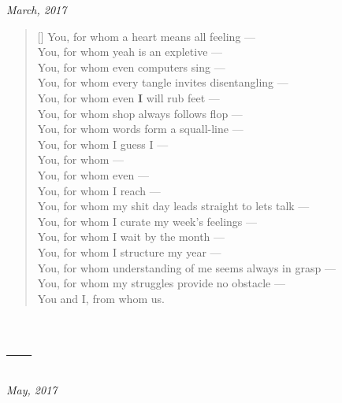 \hfill\textit{March, 2017}

\begin{verse}[\textwidth]
  You, for whom a heart means all feeling ---\\
  You, for whom yeah is an expletive ---\\
  You, for whom even computers sing ---\\
  You, for whom every tangle invites disentangling ---\\
  You, for whom even \textbf{I} will rub feet ---\\
  You, for whom shop always follows flop ---\\
  You, for whom words form a squall-line ---\\
  You, for whom I guess I ---\\
  You, for whom ---\\
  You, for whom even ---\\
  You, for whom I reach ---\\
  You, for whom my shit day leads straight to lets talk ---\\
  You, for whom I curate my week's feelings ---\\
  You, for whom I wait by the month ---\\
  You, for whom I structure my year ---\\
  You, for whom understanding of me seems always in grasp ---\\
  You, for whom my struggles provide no obstacle ---\\
  You and I, from whom us.
\end{verse}
\newpage

\section{---}

\hfill\textit{May, 2017}

